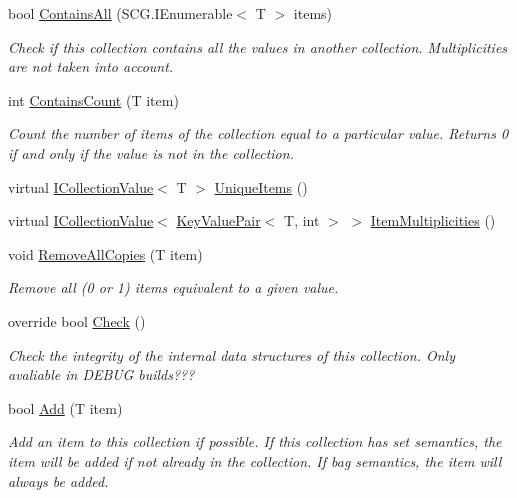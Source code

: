 \begin{DoxyCompactItemize}
bool \hyperlink{class_c5_1_1_sorted_array_a5112ec4af3590219c5b24957f9a0dad9}{Contains\+All} (S\+C\+G.\+I\+Enumerable$<$ T $>$ items)
\begin{DoxyCompactList}\small\item\em Check if this collection contains all the values in another collection. Multiplicities are not taken into account. \end{DoxyCompactList}\item 
int \hyperlink{class_c5_1_1_sorted_array_aa8ebd1f6cb041cf1d57299f217f65243}{Contains\+Count} (T item)
\begin{DoxyCompactList}\small\item\em Count the number of items of the collection equal to a particular value. Returns 0 if and only if the value is not in the collection. \end{DoxyCompactList}\item 
virtual \hyperlink{interface_c5_1_1_i_collection_value}{I\+Collection\+Value}$<$ T $>$ \hyperlink{class_c5_1_1_sorted_array_abdf7dbe61c27ce24d2443c941a0f4a53}{Unique\+Items} ()
\item 
virtual \hyperlink{interface_c5_1_1_i_collection_value}{I\+Collection\+Value}$<$ \hyperlink{struct_c5_1_1_key_value_pair}{Key\+Value\+Pair}$<$ T, int $>$ $>$ \hyperlink{class_c5_1_1_sorted_array_af410b4ad3cee1526a8d3b4fc6ec7a3c5}{Item\+Multiplicities} ()
\item 
void \hyperlink{class_c5_1_1_sorted_array_a7f3181ddc47e86407b2c87d593dc8386}{Remove\+All\+Copies} (T item)
\begin{DoxyCompactList}\small\item\em Remove all (0 or 1) items equivalent to a given value. \end{DoxyCompactList}\item 
override bool \hyperlink{class_c5_1_1_sorted_array_a1b4c759074c4171089f65156607501d4}{Check} ()
\begin{DoxyCompactList}\small\item\em Check the integrity of the internal data structures of this collection. Only avaliable in D\+E\+B\+U\+G builds??? \end{DoxyCompactList}\item 
bool \hyperlink{class_c5_1_1_sorted_array_a6d4091d5dd1ab9b4637ae16f2bca53e3}{Add} (T item)
\begin{DoxyCompactList}\small\item\em Add an item to this collection if possible. If this collection has set semantics, the item will be added if not already in the collection. If bag semantics, the item will always be added. \end{DoxyCompactList}\item 

\end{DoxyCompactItemize}
